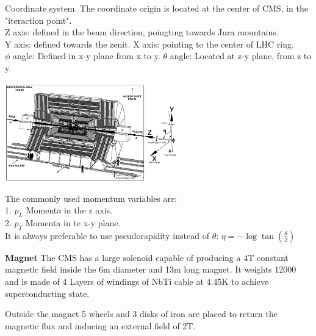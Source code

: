 \documentclass[8pt]{beamer}
\begin{document}
\begin{frame}[fragile]{Coordinate system.}
	The coordinate origin is located at the center of CMS, in the "iteraction point".
	\\
	Z axis: defined in the beam direction, poingting towards Jura mountains.
	\\
	Y axis: defined towards the zenit.
	X axis: pointing to the center of LHC ring.
	\\
	$\phi$ angle: Defined in x-y plane from x to y.
	$\theta$ angle: Located at z-y plane, from z to y.
	\vspace{0.5cm}
	\begin{minipage}{0.6\textwidth}%
		\includegraphics[width=7.5cm]{10}
	\end{minipage}
	\hfill
	\begin{minipage}{0.3\textwidth}\raggedleft
		\justify
		The commonly used momentum variables are:
		\\
		1. \textbf{$p_L$} Momenta in the z axis.
		\\
		2. \textbf{$p_T$} Momenta in te x-y plane.
		\\
		It is always preferable to use pseudorapidity instead of $\theta$:
		$\eta=-\log\tan\left(\frac{\theta}{2}\right)$
		
	\end{minipage}
	\textbf{Magnet}
	The CMS has a large solenoid capable of producing a 4T constant magnetic field inside the 6m diameter and 13m long magnet. It weights 12000 and is made of 4 Layers of windings of NbTi cable at 4.45K to achieve superconducting state.
	
	Outside the magnet 5 wheels and 3 disks of iron are placed to return the magnetic flux and inducing an external field of 2T.

\end{frame}

\end{document}
